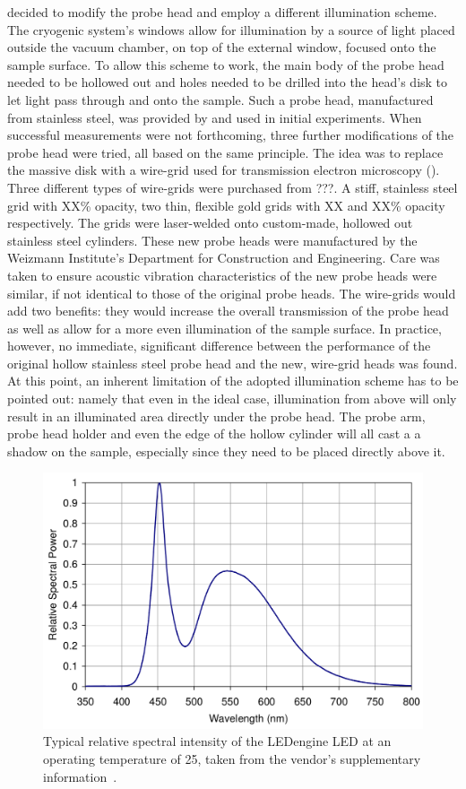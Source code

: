 decided to modify the probe head and employ a different illumination scheme. The cryogenic system's windows allow for illumination by a source of light placed outside the vacuum chamber, on top of the external window, focused onto the sample surface. To allow this scheme to work, the main body of the probe head needed to be hollowed out and holes needed to be drilled into the head's disk to let light pass through and onto the sample. Such a probe head, manufactured from stainless steel, was provided by \McA{} and used in initial experiments. When successful measurements were not forthcoming, three further modifications of the probe head were tried, all based on the same principle. The idea was to replace the massive disk with a wire-grid used for transmission electron microscopy (\tem{}). Three different types of wire-grids were purchased from ???. A stiff, stainless steel grid with XX\% opacity, two thin, flexible gold grids with XX and XX\% opacity respectively. The grids were laser-welded onto custom-made, hollowed out stainless steel cylinders. These new probe heads were manufactured by the Weizmann Institute's Department for Construction and Engineering. Care was taken to ensure acoustic vibration characteristics of the new probe heads were similar, if not identical to those of the original \McA{} probe heads. The wire-grids would add two benefits: they would increase the overall transmission of the probe head as well as allow for a more even illumination of the sample surface. In practice, however, no immediate, significant difference between the performance of the original hollow stainless steel probe head and the new, \tem{} wire-grid heads was found. At this point, an inherent limitation of the adopted illumination scheme has to be pointed out: namely that even in the ideal case, illumination from above will only result in an illuminated area directly under the probe head. The probe arm, probe head holder and even the edge of the hollow cylinder will all cast a a shadow on the sample, especially since they need to be placed directly above it.\\
\begin{figure}
\centering
	\includegraphics[width=0.8\linewidth]{./figs/ledspec}
	\caption{Typical relative spectral intensity of the LEDengine LED at an operating temperature of 25\degcent{}, taken from the vendor's supplementary information~\cite[p. 10]{ledengin}.}
	\label{fig:ledspec}
\end{figure}
